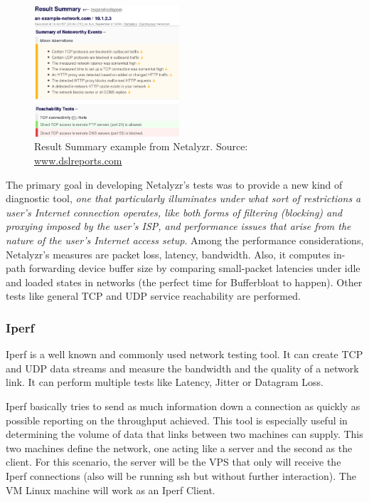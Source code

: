 \begin{figure}
	\begin{center}
		\includegraphics[width=0.48\textwidth]{img/netalyzr_ex}
	\end{center}
	\caption[Result Summary example from Netalyzr]{Result Summary example from Netalyzr. Source:
	\url{www.dslreports.com}}   
	\label{netalyzr_ex} 
\end{figure}

The primary goal in developing Netalyzr's tests was to provide a new kind of
diagnostic tool, \emph{one that particularly illuminates under what sort of
restrictions a user's Internet connection operates, like both forms of filtering
(blocking) and proxying imposed by the user's ISP, and performance issues that
arise from the nature of the user's Internet access setup}\cite{netalyzr}. Among
the performance considerations, Netalyzr's measures are packet loss, latency,
bandwidth. Also, it computes in-path forwarding device buffer size by comparing
small-packet latencies under idle and loaded states in networks (the perfect
time for Bufferbloat to happen). Other tests like general TCP and UDP service
reachability are performed.

\subsubsection{Iperf}
Iperf is a well known and commonly used network testing tool. It can create
TCP and UDP data streams and measure the bandwidth and the quality of a network
link. It can perform multiple tests like Latency, Jitter or Datagram Loss.

Iperf basically tries to send as much information down a connection as quickly
as possible reporting on the throughput achieved. This tool is especially useful
in determining the volume of data that links between two machines can supply.
This two machines define the network, one acting like a server and the second as
the client. For this scenario, the server will be the VPS that only will receive
the Iperf connections (also will be running ssh but without further
interaction). The VM Linux machine will work as an Iperf Client.


